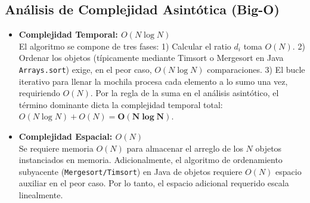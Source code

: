 \documentclass[11pt, a4paper]{article}
\begin{document}
\subsection{Análisis de Complejidad Asintótica (Big-O)}
\begin{itemize}
    \item \textbf{Complejidad Temporal: $O(N \log N)$} \\
    El algoritmo se compone de tres fases:
    1) Calcular el ratio $d_i$ toma $O(N)$. 
    2) Ordenar los objetos (típicamente mediante Timsort o Mergesort en Java \texttt{Arrays.sort}) exige, en el peor caso, $O(N \log N)$ comparaciones. 
    3) El bucle iterativo para llenar la mochila procesa cada elemento a lo sumo una vez, requiriendo $O(N)$. 
    Por la regla de la suma en el análisis asintótico, el término dominante dicta la complejidad temporal total: $O(N \log N) + O(N) = \mathbf{O(N \log N)}$.
    
    \item \textbf{Complejidad Espacial: $O(N)$} \\
    Se requiere memoria $O(N)$ para almacenar el arreglo de los $N$ objetos instanciados en memoria. Adicionalmente, el algoritmo de ordenamiento subyacente (\texttt{Mergesort/Timsort}) en Java de objetos requiere $O(N)$ espacio auxiliar en el peor caso. Por lo tanto, el espacio adicional requerido escala linealmente.
\end{itemize}
\end{document}
